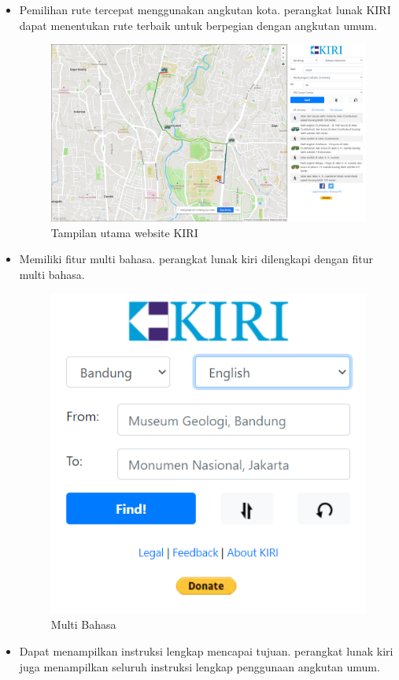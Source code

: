 \begin{itemize}
	\item Pemilihan rute tercepat menggunakan angkutan kota.
	perangkat lunak KIRI dapat menentukan rute terbaik untuk berpegian dengan angkutan umum. 
	\begin{figure}[H]
	\centering
	\includegraphics[scale=0.3]{Gambar/kiri-example-1}
	\caption{Tampilan utama website KIRI}
	\label{fig:my_label}
\end{figure}
	\item Memiliki fitur multi bahasa.
	perangkat lunak kiri dilengkapi dengan fitur multi bahasa. 
\begin{figure}[H]
	\centering
	\includegraphics[scale=0.3]{Gambar/multibahasa.PNG}
	\caption{Multi Bahasa}
	\label{fig:my_label}
\end{figure}
	\item Dapat menampilkan instruksi lengkap  mencapai tujuan.
	perangkat lunak kiri juga menampilkan seluruh instruksi lengkap penggunaan angkutan umum. 
\end{itemize}
